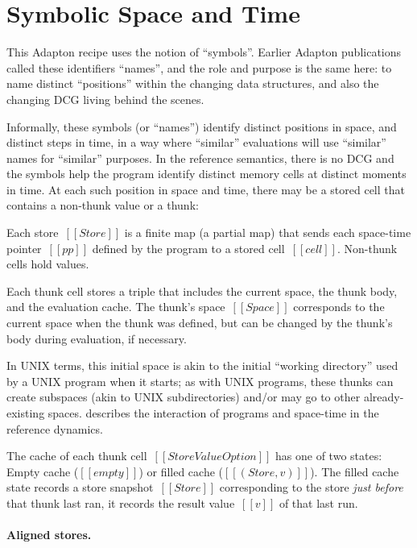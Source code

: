 \documentclass[11pt]{article}
\begin{document}
\section{Symbolic Space and Time}
\label{sec:symbolic-space-and-time}

This Adapton recipe uses the notion of ``symbols''.
%
Earlier Adapton publications called these identifiers ``names'', and
the role and purpose is the same here: to name distinct ``positions''
within the changing data structures, and also the changing DCG living
behind the scenes.

Informally, these symbols (or ``names'') identify distinct positions
in space, and distinct steps in time, in a way where ``similar''
evaluations will use ``similar'' names for ``similar'' purposes.
%
In the reference semantics, there is no DCG and the symbols help the
program identify distinct memory cells at distinct moments in time.
%
At each such position in space and time, there may be a stored cell
that contains a non-thunk value or a thunk:


\ottgrammartabular{\ottStore}
\ottgrammartabular{\ottcell}
\ottgrammartabular{\ottStoreValueOption}

Each store~$[[Store]]$ is a finite map (a partial map) that sends each space-time pointer~$[[pp]]$
defined by the program to a stored cell~$[[cell]]$.
%
Non-thunk cells hold values.

Each thunk cell stores a triple that includes the current space, the thunk body, and the evaluation cache.
%
The thunk's space~$[[Space]]$ corresponds to the current
space when the thunk was defined, but can be changed by the thunk's body during
evaluation, if necessary.

In UNIX terms, this initial space is akin to the initial ``working
directory'' used by a UNIX program when it starts; as with UNIX
programs, these thunks can create subspaces (akin to UNIX
subdirectories) and/or may go to other already-existing spaces.
%
 describes the interaction of
programs and space-time in the reference dynamics.

The cache of each thunk cell~$[[StoreValueOption]]$ has one of two states:
Empty cache ($[[empty]]$) or
filled cache ($[[(Store, v)]]$).
%
The filled cache state records a store snapshot~$[[Store]]$
corresponding to the store \emph{just before} that thunk last ran,
it records the result value~$[[v]]$ of that last run.

\paragraph{Aligned stores.}
\end{document}
